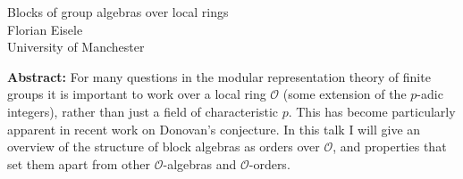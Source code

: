 \documentclass[12pt,a4paper]{article}
\begin{document}
\thispagestyle{empty} 
\begin{center}
{\large  Blocks of group algebras over local rings}\\
\vspace*{.5cm}
Florian Eisele\\
University of Manchester\\
\end{center}
\vspace*{.8cm}

{\bf Abstract:} For many questions in the modular representation theory of finite groups it is important to work over a local ring $\mathcal{O}$ (some extension of the $p$-adic integers), rather than just a field of characteristic $p$. This has become particularly apparent in recent work on Donovan’s conjecture. In this talk I will give an overview of the structure of block algebras as orders over $\mathcal{O}$, and properties that set them apart from other $\mathcal{O}$-algebras and $\mathcal{O}$-orders.
\end{document}
